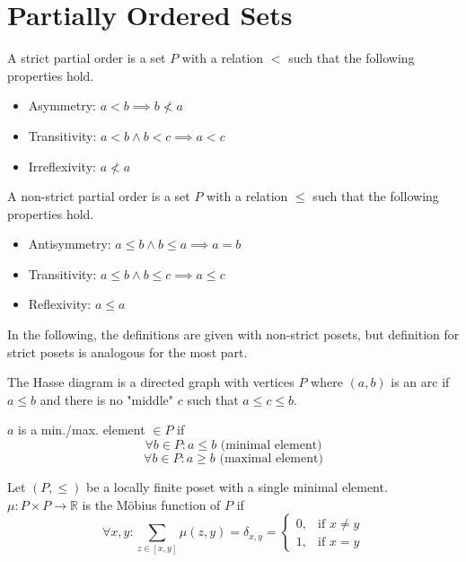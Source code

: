 \section{Partially Ordered Sets}

\begin{definition}
    A strict partial order is a set $P$ with a relation $<$ such that the following properties hold.
    \begin{itemize}
        \item Asymmetry: $a < b \implies b \nless a$
        \item Transitivity: $a < b \land b < c \implies a < c$  
        \item Irreflexivity: $a \nless a$
    \end{itemize}
\end{definition}

\begin{definition}
    A non-strict partial order is a set $P$ with a relation $\leq$ such that the following properties hold.
    \begin{itemize}
        \item Antisymmetry: $a \leq b \land b \leq a \implies a = b$
        \item Transitivity: $a \leq b \land b \leq c \implies a \leq c$  
        \item Reflexivity: $a \leq a$
    \end{itemize}
\end{definition}

In the following, the definitions are given with non-strict posets, but definition for strict posets is analogous for the most part.

\begin{definition}
    The Hasse diagram is a directed graph with vertices $P$ where $(a, b)$ is an arc if $a \leq b$ and there is no "middle" $c$ such that $a \leq c \leq b$.
\end{definition}

\begin{definition}
    $a$ is a min./max. element $\in P$ if 
    \[
    \forall b \in P: a \leq b \text{ (minimal element)}
    \]
    \[
    \forall b \in P: a \geq b \text{ (maximal element)}
    \]
\end{definition}

\begin{definition}
    Let $(P, \leq)$ be a locally finite poset with a single minimal element.
    $\mu: P \times P \to \mathbb{R}$ is the Möbius function of $P$ if
    \[
    \forall x,y: \sum_{z \in [x, y]} \mu(z, y) = \delta_{x, y} = 
    \begin{cases}
        0, & \text{if } x \neq y\\
        1, & \text{if } x = y
    \end{cases}
    \]
\end{definition}

